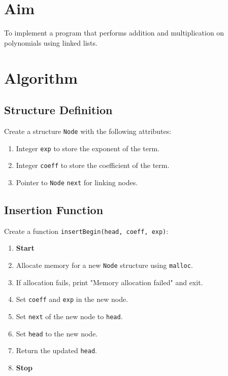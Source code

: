
\section{Aim}
To implement a program that performs addition and multiplication on polynomials using linked lists.

\section{Algorithm}
 {\selectfont

  \subsection{Structure Definition}
  Create a structure \texttt{Node} with the following attributes:
  \begin{enumerate}[label=\arabic*:,left=0pt]
    \item Integer \texttt{exp} to store the exponent of the term.
    \item Integer \texttt{coeff} to store the coefficient of the term.
    \item Pointer to \texttt{Node} \texttt{next} for linking nodes.
  \end{enumerate}

  \subsection{Insertion Function}
  Create a function \texttt{insertBegin(head, coeff, exp)}:
  \begin{enumerate}[label=\arabic*:,left=0pt]
    \item \textbf{Start}
    \item Allocate memory for a new \texttt{Node} structure using \texttt{malloc}.
    \item If allocation fails, print "Memory allocation failed" and exit.
    \item Set \texttt{coeff} and \texttt{exp} in the new node.
    \item Set \texttt{next} of the new node to \texttt{head}.
    \item Set \texttt{head} to the new node.
    \item Return the updated \texttt{head}.
    \item \textbf{Stop}
  \end{enumerate}

}
